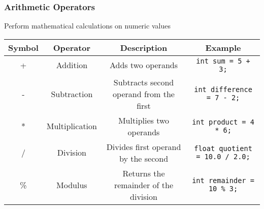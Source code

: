 \documentclass[11pt,A4]{article}
\begin{document}
            \subsubsection{Arithmetic Operators} 
            Perform mathematical calculations on numeric values
            \begin{table}[h]
                \centering
                \setlength{\arrayrulewidth}{0.3mm}
                \renewcommand{\arraystretch}{1.2}
                \begin{tabular}{cccc}
                    \toprule
                    Symbol & Operator & Description & Example \\
                    \midrule
                    + & Addition & Adds two operands & \verb|int sum = 5 + 3;| \\
                    \arrayrulecolor{gray!50}\cmidrule(lr){1-4}\arrayrulecolor{black}
                    - & Subtraction & Subtracts second operand from the first & \verb|int difference = 7 - 2;| \\
                    \arrayrulecolor{gray!50}\cmidrule(lr){1-4}\arrayrulecolor{black}
                    * & Multiplication & Multiplies two operands & \verb|int product = 4 * 6;| \\
                    \arrayrulecolor{gray!50}\cmidrule(lr){1-4}\arrayrulecolor{black}
                    / & Division & Divides first operand by the second & \verb|float quotient = 10.0 / 2.0;| \\
                    \arrayrulecolor{gray!50}\cmidrule(lr){1-4}\arrayrulecolor{black}
                    \% & Modulus & Returns the remainder of the division & \verb|int remainder = 10 % 3;| \\
                    \bottomrule
                \end{tabular}
            \end{table}  \\ 
            
\end{document}
